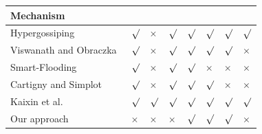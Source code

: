 
\newcommand{\YES}{{\scriptsize $\surd$ }\xspace}
\newcommand{\NO}{{\scriptsize $\times$} \xspace}
\newcommand{\DONTKNOW}{ --\xspace}
\newcommand{\USER}{\textit{User}\xspace}
\newcommand{\KERNEL}{ \textit{Kernel}\xspace}


\begin{table}[t!]
\setlength\tabcolsep{1pt}
\renewcommand\arraystretch{0.99}
\footnotesize
\centering


\begin{tabular}{AEDCCCCF}

{\scriptsize \textbf{Mechanism}} & {\scriptsize {} } & {\scriptsize {} } & {\scriptsize{}} &  {\scriptsize{}} & {\scriptsize{}} & {\scriptsize{}} & {\scriptsize{}} \\

\midrule

{\scriptsize Hypergossiping~\cite{hypergossiping} } & \YES & \NO & \YES & \YES & \YES & \YES & \YES  \\ \hline
{\scriptsize Viswanath and Obraczka~\cite{Viswanath02anadaptive} } & \YES & \NO & \YES & \YES & \YES & \YES & \NO  \\ \hline
{\scriptsize Smart-Flooding~\cite{Abdou2012} } & \YES & \NO & \YES & \YES & \NO & \NO & \NO  \\ \hline
{\scriptsize Cartigny and Simplot~\cite{border_node_retransmission_telsys03} } & \YES & \NO & \YES & \YES & \YES & \NO & \NO  \\ \hline
{\scriptsize Kaixin et al.~\cite{Kaixin2002} } & \YES & \YES & \YES & \YES & \YES & \YES & \YES  \\ \hline
{\scriptsize Our approach } & \NO & \NO & \NO & \YES & \YES & \YES & \NO  \\ \hline



\end{tabular}
\end{table}
